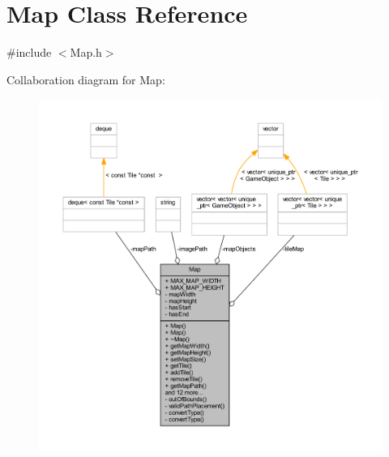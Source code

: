 \hypertarget{class_map}{\section{Map Class Reference}
\label{class_map}
}


{\ttfamily \#include $<$Map.\+h$>$}



Collaboration diagram for Map\+:\nopagebreak
\begin{figure}[H]
\begin{center}
\leavevmode
\includegraphics[width=350pt]{class_map__coll__graph}
\end{center}
\end{figure}
